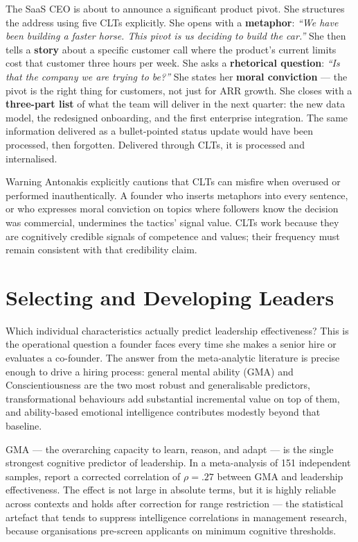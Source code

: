 \begin{example}
The SaaS CEO is about to announce a significant product pivot. She structures the address using
five CLTs explicitly. She opens with a \textbf{metaphor}: \emph{``We have been building a
faster horse. This pivot is us deciding to build the car.''}  She then tells a \textbf{story}
about a specific customer call where the product's current limits cost that customer three hours
per week. She asks a \textbf{rhetorical question}: \emph{``Is that the company we are trying to
be?''} She states her \textbf{moral conviction} --- the pivot is the right thing for customers,
not just for ARR growth. She closes with a \textbf{three-part list} of what the team will
deliver in the next quarter: the new data model, the redesigned onboarding, and the first
enterprise integration. The same information delivered as a bullet-pointed status update would
have been processed, then forgotten. Delivered through CLTs, it is processed and internalised.
\end{example}

\begin{admonition}{Warning}
Antonakis explicitly cautions that CLTs can misfire when overused or performed inauthentically.
A founder who inserts metaphors into every sentence, or who expresses moral conviction on topics
where followers know the decision was commercial, undermines the tactics' signal value. CLTs
work because they are cognitively credible signals of competence and values; their frequency
must remain consistent with that credibility claim.
\end{admonition}

\section{Selecting and Developing Leaders}\label{sec:leader-selection}

Which individual characteristics actually predict leadership effectiveness? This is the
operational question a founder faces every time she makes a senior hire or evaluates a
co-founder. The answer from the meta-analytic literature is precise enough to drive a hiring
process: general mental ability (GMA) and Conscientiousness are the two most robust and
generalisable predictors, transformational behaviours add substantial incremental value on top
of them, and ability-based emotional intelligence contributes modestly beyond that baseline.

GMA --- the overarching capacity to learn, reason, and adapt --- is the single strongest
cognitive predictor of leadership. In a meta-analysis of \num{151} independent samples,
\textcite{judge2004intelligence} report a corrected correlation of \(\rho = .27\) between GMA
and leadership effectiveness. The effect is not large in absolute terms, but it is highly
reliable across contexts and holds after correction for range restriction --- the statistical
artefact that tends to suppress intelligence correlations in management research, because
organisations pre-screen applicants on minimum cognitive thresholds.

